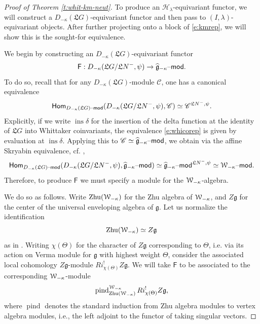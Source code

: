 \documentclass[11pt,reqno]{amsart}
\newcommand{\sH}{\mathscr{H}}
\newcommand{\fL}{\mathfrak{L}}
\newcommand{\fg}{\mathfrak{g}}
\newcommand{\on}{\operatorname}
\newcommand{\scc}{\mathscr{C}}
\theoremstyle{remark}
\numberwithin{equation}{section}
\newcommand{\gmk}{\widehat{\fg}_{-\kappa}}
\newcommand{\sW}{\EuScript{W}}
\renewcommand{\mod}{\text{\textendash}\mathsf{mod}}
\begin{document}
\begin{proof}[Proof of Theorem \ref{t:whit-km-neut}] 

To produce an $\sH_\lambda$-equivariant functor, we will 
construct a $D_{-\kappa}(\fL G)$-equivariant functor and then pass to 
$(I,\lambda)$-equivariant objects. After further projecting onto a block of 
\eqref{e:kmrep}, we will show this is the sought-for equivalence. 
		
We begin by constructing an $D_{-\kappa}(\fL G)$-equivariant functor
%
\[ \mathsf{F}: D_{-\kappa}(\fL G / \fL N^-, \psi) \rightarrow \gmk\mod.
\]
%
To do so, recall that for any $D_{-\kappa}(\fL G)$-module $\scc$, one has a 
canonical equivalence
%
\begin{equation} \label{e:whicorep} \mathsf{Hom}_{D_{-\kappa}(\fL G)\mod}( 
D_{-\kappa}(\fL G / \fL N^-, \psi), 
\scc) \simeq \scc^{\fL N^-, \psi}.
\end{equation}
%
Explicitly, if we write $\on{ins} \delta$ for the insertion of the delta 
function at the identity of $\fL G$ into Whittaker coinvariants, the 
equivalence \eqref{e:whicorep} is given by evaluation at $\on{ins} \delta$. 
Applying this to $\scc 
\simeq \gmk\mod$, we 
obtain via the affine Skryabin equivalence, cf. \cite{whit}, 
%
\begin{equation} \label{e:whitmapsout}
 \mathsf{Hom}_{D_{-\kappa}(\fL G)\mod}( D_{-\kappa}(\fL G / \fL N^-, 
 \psi), \gmk\mod) \simeq \gmk\mod^{\fL N^-, \psi} \simeq 
 \sW_{-\kappa}\mod.
\end{equation}
%
Therefore, to produce $\mathsf{F}$ we must specify a module for the 
$\sW_{-\kappa}$-algebra. 



We do so as follows. Write $\on{Zhu}(\sW_{-\kappa})$ for the Zhu algebra of 
$\sW_{-\kappa}$, and $Z\fg$ for the 
center of the universal enveloping algebra of $\fg$. Let us normalize the 
identification \[\on{Zhu}(\sW_{-\kappa}) \simeq Z \fg\] as in \cite{lpw}. 
Writing 
$\chi(\Theta)$ for the character of $Z \fg$ corresponding to $\Theta$, i.e. via 
its action on Verma module for $\fg$ with highest weight $\Theta$, consider the 
associated local 
cohomology $Z\fg$-module $Ri_{\chi(\Theta)}^! Z \fg$. We will take $\mathsf{F}$ 
to be associated to the 
corresponding 
$\sW_{-\kappa}$-module 
%
\begin{equation} \label{e:thewmod}
\on{pind}_{\on{Zhu}(\sW_{-\kappa})}^{\sW_{-\kappa}} Ri_{\chi(\Theta)}^! Z \fg,
\end{equation}
%
where $\on{pind}$ denotes the standard induction from Zhu algebra modules to 
vertex algebra modules, i.e., the left adjoint to the functor of taking 
singular vectors. 


\end{proof}
\end{document}
